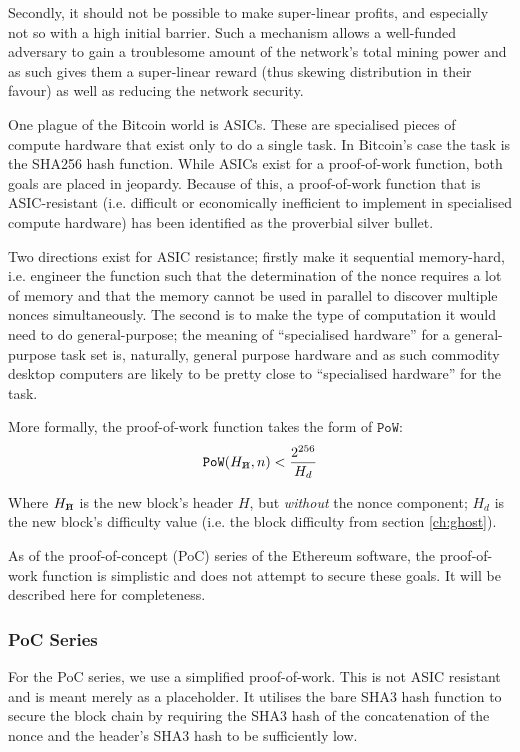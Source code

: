 \documentclass[9pt,oneside]{amsart}
\newcommand{\hcancel}[1]{%
    \tikz[baseline=(tocancel.base)]{
        \node[inner sep=0pt,outer sep=0pt] (tocancel) {#1};
        \draw[black] (tocancel.south west) -- (tocancel.north east);
    }%
}%
\begin{document}
\begin{multicols}{2}
Secondly, it should not be possible to make super-linear profits, and especially not so with a high initial barrier. Such a mechanism allows a well-funded adversary to gain a troublesome amount of the network's total mining power and as such gives them a super-linear reward (thus skewing distribution in their favour) as well as reducing the network security.

One plague of the Bitcoin world is ASICs. These are specialised pieces of compute hardware that exist only to do a single task. In Bitcoin's case the task is the SHA256 hash function. While ASICs exist for a proof-of-work function, both goals are placed in jeopardy. Because of this, a proof-of-work function that is ASIC-resistant (i.e. difficult or economically inefficient to implement in specialised compute hardware) has been identified as the proverbial silver bullet.

Two directions exist for ASIC resistance; firstly make it sequential memory-hard, i.e. engineer the function such that the determination of the nonce requires a lot of memory and that the memory cannot be used in parallel to discover multiple nonces simultaneously. The second is to make the type of computation it would need to do general-purpose; the meaning of ``specialised hardware''  for a general-purpose task set is, naturally, general purpose hardware and as such commodity desktop computers are likely to be pretty close to ``specialised hardware'' for the task.

More formally, the proof-of-work function takes the form of $\mathtt{PoW}$:
\begin{equation}
\mathtt{PoW}(H_{\hcancel{n}}, n) < \frac{2^{256}}{H_d}
\end{equation}

Where $H_{\hcancel{n}}$ is the new block's header $H$, but \textit{without} the nonce component; $H_d$ is the new block's difficulty value (i.e. the block difficulty from section \ref{ch:ghost}).

As of the proof-of-concept (PoC) series of the Ethereum software, the proof-of-work function is simplistic and does not attempt to secure these goals. It will be described here for completeness.

\subsubsection{PoC Series}

For the PoC series, we use a simplified proof-of-work. This is not ASIC resistant and is meant merely as a placeholder. It utilises the bare SHA3 hash function to secure the block chain by requiring the SHA3 hash of the concatenation of the nonce and the header's SHA3 hash to be sufficiently low.


\end{multicols}
\end{document}
